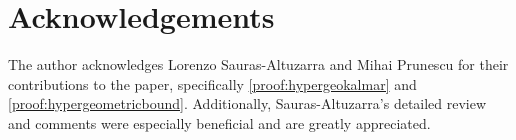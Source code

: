 \documentclass[10pt,a4paper]{article}
\theoremstyle{plain}
\begin{document}
\section{Acknowledgements}
The author acknowledges Lorenzo Sauras-Altuzarra and Mihai Prunescu for their contributions to the paper, specifically \cref{proof:hypergeokalmar} and \cref{proof:hypergeometricbound}. Additionally, Sauras-Altuzarra's detailed review and comments were especially beneficial and are greatly appreciated.

\footnotesize
\setlength{\parskip}{0.0em}
\baselineskip=0.0in
\setlength{\parindent}{0pt}
\begingroup
\raggedright


\endgroup
\end{document}
